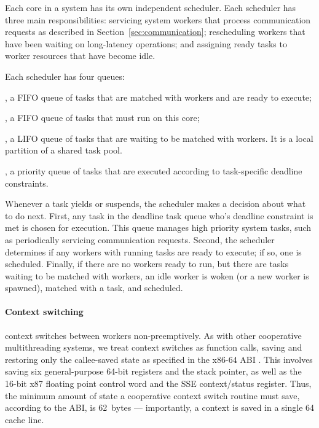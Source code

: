 Each core in a \Grappa system has its own independent scheduler. Each
scheduler has three main responsibilities: servicing system workers that
process communication requests as described in
Section~\ref{sec:communication}; rescheduling workers that have been waiting
on long-latency operations; and assigning ready tasks to worker resources that
have become idle.

Each scheduler has four queues:

, a FIFO queue of tasks that are
  matched with workers and are ready to execute;

, a FIFO queue of tasks that must run on this core;

,  a LIFO queue of tasks that are
  waiting to be matched with workers. It is a local partition of a shared
  task pool.

, a priority queue of tasks that are executed according to task-specific deadline constraints.

Whenever a task yields or suspends, the scheduler makes a decision about what to do next. First, any task in the deadline task queue who's deadline constraint is met is chosen for execution.  This queue manages high priority system tasks, such as periodically servicing communication requests.  Second, the scheduler determines if any workers with running tasks are ready to execute; if so, one is scheduled. Finally, if there are no workers ready to run, but there are tasks waiting to be matched with workers, an idle worker is woken (or a new worker is spawned), matched with a task, and scheduled.

\paragraph{Context switching} \Grappa context switches between workers
non-preemptively. As with other cooperative multithreading systems, we
treat context switches as function calls, saving and restoring only the
callee-saved state as specified in the x86-64 ABI \cite{amd64:abi:2012}. This
involves saving six general-purpose 64-bit registers and the stack
pointer, as well as the 16-bit x87 floating point control word and the
SSE context/status register. Thus, the minimum amount of state a
cooperative context switch routine must save, according to the ABI, is
62~bytes --- importantly, a context is saved in a single 64 cache line. 

